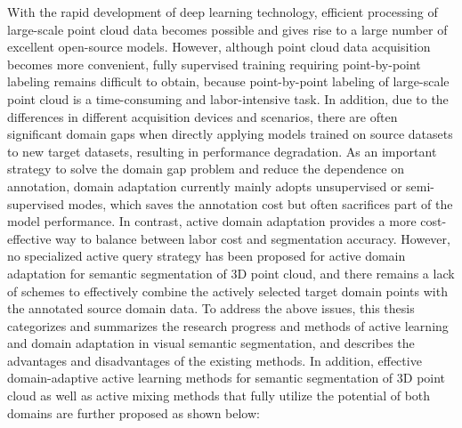 With the rapid development of deep learning technology, efficient processing of large-scale point cloud data becomes possible and gives rise to a large number of excellent open-source models.
However, although point cloud data acquisition becomes more convenient, fully supervised training requiring point-by-point labeling remains difficult to obtain, because point-by-point labeling of large-scale point cloud is a time-consuming and labor-intensive task.
In addition, due to the differences in different acquisition devices and scenarios, there are often significant domain gaps when directly applying models trained on source datasets to new target datasets, resulting in performance degradation. As an important strategy to solve the domain gap problem and reduce the dependence on annotation, domain adaptation currently mainly adopts unsupervised or semi-supervised modes, which saves the annotation cost but often sacrifices part of the model performance. In contrast, active domain adaptation provides a more cost-effective way to balance between labor cost and segmentation accuracy. 
However, no specialized active query strategy has been proposed for active domain adaptation for semantic segmentation of 3D point cloud, and there remains a lack of schemes to effectively combine the actively selected target domain points with the annotated source domain data.
To address the above issues, this thesis categorizes and summarizes the research progress and methods of active learning and domain adaptation in visual semantic segmentation, and describes the advantages and disadvantages of the existing methods. In addition, effective domain-adaptive active learning methods for semantic segmentation of 3D point cloud as well as active mixing methods that fully utilize the potential of both domains are further proposed as shown below:

